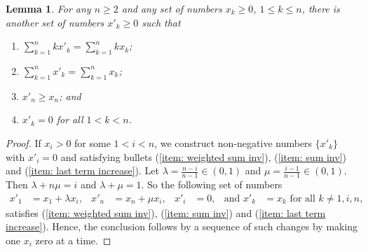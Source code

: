 \documentclass{amsart}
\newtheorem{lemma}[theorem]{Lemma}
\theoremstyle{definition}
\numberwithin{equation}{section}
\theoremstyle{theorem}
\theoremstyle{remark}
\begin{document}
	\begin{lemma}\label{lemma: reduction}
		For any $n\ge2$ and any set of numbers $x_k\ge 0$, $1\le k\le n$, there is another set of numbers $x'_k\ge0$ such that 
		\begin{enumerate}
			\item $\sum_{k=1}^n k x'_k=\sum_{k=1}^n k x_k$;\label{item: weighted sum inv}
			\item $\sum_{k=1}^n x'_k = \sum_{k=1}^n x_k$;\label{item: sum inv}
			\item $x'_n\ge x_n$; and\label{item: last term increase}
			\item $x'_k=0$ for all $1<k<n$.
		\end{enumerate}
	\end{lemma}
	\begin{proof}
		If $x_i>0$ for some $1<i<n$, we construct non-negative numbers $\{x'_k\}$ with $x'_i=0$ and satisfying bullets (\ref{item: weighted sum inv}), (\ref{item: sum inv}) and (\ref{item: last term increase}). Let $\lambda=\frac{n-i}{n-1}\in (0,1)$ and $\mu=\frac{i-1}{n-1}\in (0,1)$. Then $\lambda+n\mu=i$ and $\lambda+\mu=1$. So the following set of numbers
		\begin{align*}
			x'_1&=x_1+\lambda x_i, & x'_n&=x_n+\mu x_i, &x'_i&=0, & \text{and } x'_k&=x_k\text{ for all }k\neq 1,i,n,
		\end{align*}
		satisfies (\ref{item: weighted sum inv}), (\ref{item: sum inv}) and (\ref{item: last term increase}). 
		Hence, the conclusion follows by a sequence of such changes by making one $x_i$ zero at a time.
	\end{proof}
	
\end{document}
